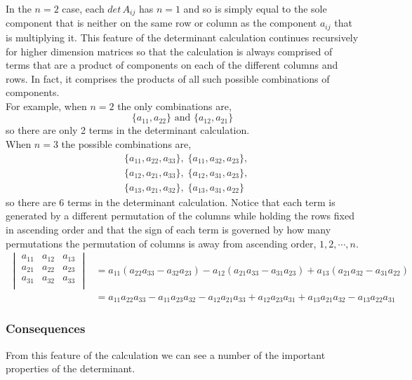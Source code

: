 \documentclass[MathsNotesBase.tex]{subfiles}
\begin{document}
{		In the $n = 2$ case, each $det\, A_{ij}$ has $n = 1$ and so is simply equal to the sole component that is neither on the same row or column as the component $a_{ij}$ that is multiplying it. This feature of the determinant calculation continues recursively for higher dimension matrices so that the calculation is always comprised of terms that are a product of components on each of the different columns and rows. In fact, it comprises the products of all such possible combinations of components.\\
		For example, when $n = 2$ the only combinations are,
		\[ \{a_{11}, a_{22}\} \text{ and } \{a_{12}, a_{21}\} \]
		so there are only 2 terms in the determinant calculation.\\
		When $n = 3$ the possible combinations are,
		\begin{align*}
			&\{a_{11}, a_{22}, a_{33}\},\; \{a_{11}, a_{32}, a_{23}\},\\
			&\{a_{12}, a_{21}, a_{33}\},\; \{a_{12}, a_{31}, a_{23}\},\\
			&\{a_{13}, a_{21}, a_{32}\},\; \{a_{13}, a_{31}, a_{22}\} 
		\end{align*}
		so there are 6 terms in the determinant calculation. Notice that each term is generated by a different permutation of the columns while holding the rows fixed in ascending order and that the sign of each term is governed by how many permutations the permutation of columns is away from ascending order, $1,2,\cdots,n$.
		\begin{align*}
		\begin{vmatrix}    
			a_{11}  &  a_{12} & a_{13} \\
			a_{21}  &  a_{22} & a_{23} \\
			a_{31}  &  a_{32} & a_{33} \\		
		\end{vmatrix}
		&= a_{11}(a_{22}a_{33} - a_{32}a_{23}) - a_{12}(a_{21}a_{33} - a_{31}a_{23}) + a_{13}(a_{21}a_{32} - a_{31}a_{22}) \\
		&= a_{11}a_{22}a_{33} - a_{11}a_{23}a_{32} - a_{12}a_{21}a_{33} + a_{12}a_{23}a_{31} + a_{13}a_{21}a_{32} - a_{13}a_{22}a_{31}
		\end{align*}
		
		\subsubsection{Consequences}
		From this feature of the calculation we can see a number of the important properties of the determinant.
		
}
\end{document}
